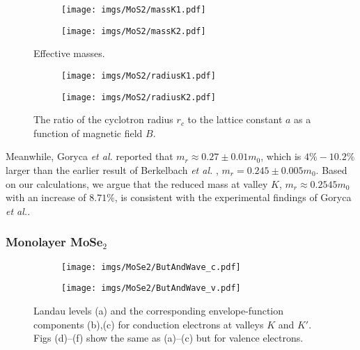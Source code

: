 \documentclass{article}
\begin{document}
\begin{figure}[htb]
	\begin{subfigure}{0.495\textwidth}
		\centering
		\texttt{[image: imgs/MoS2/massK1.pdf]}
	\end{subfigure}
	\begin{subfigure}{0.495\textwidth}
		\centering
		\texttt{[image: imgs/MoS2/massK2.pdf]}
	\end{subfigure}
	\caption{Effective masses.}
\end{figure}

\begin{figure}[!h]
	\begin{subfigure}{0.495\textwidth}
		\centering
		\texttt{[image: imgs/MoS2/radiusK1.pdf]}
	\end{subfigure}
	\begin{subfigure}{0.495\textwidth}
		\centering
		\texttt{[image: imgs/MoS2/radiusK2.pdf]}
	\end{subfigure}
	\caption{The ratio of the cyclotron radius $r_c$ to the lattice constant $a$ as a function of magnetic field $B$.}
\end{figure}

Meanwhile, Goryca \textit{et al.} \cite{goryca2019} reported that $m_{r} \approx 0.27 \pm 0.01 m_{0}$, which is $4\%-10.2\%$ larger than the earlier result of Berkelbach \textit{et al.} \cite{berkelbach2013}, $m_{r} = 0.245 \pm 0.005 m_{0}$.
Based on our calculations, we argue that the reduced mass at valley $K$, $m_{r} \approx 0.2545 m_{0}$ with an increase of $8.71\%$, is consistent with the experimental findings of Goryca \textit{et al.}.


\newpage
\subsubsection*{Monolayer MoSe$_{2}$}
\begin{figure}[htb]
	\begin{subfigure}{0.495\textwidth}
		\centering
		\texttt{[image: imgs/MoSe2/ButAndWave\_c.pdf]}
	\end{subfigure}
	\begin{subfigure}{0.495\textwidth}
		\centering
		\texttt{[image: imgs/MoSe2/ButAndWave\_v.pdf]}
	\end{subfigure}
	\caption{Landau levels (a) and the corresponding envelope-function components (b),(c) for conduction electrons at valleys $K$ and $K'$. Figs (d)–(f) show the same as (a)–(c) but for valence electrons.}
\end{figure}
\end{document}
